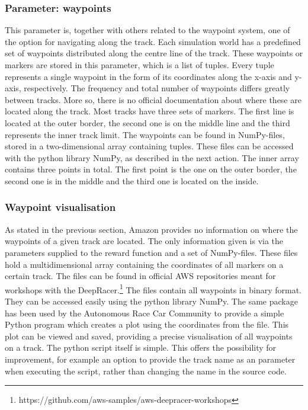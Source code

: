 \subsubsection{Parameter: waypoints}\label{sec:param_waypoints}
This parameter is, together with others related to the waypoint system, one of the option for navigating along the track. Each simulation world has a predefined set of waypoints distributed along the centre line of the track. These waypoints or markers are stored in this parameter, which is a list of tuples. Every tuple represents a single waypoint in the form of its coordinates along the x-axis and y-axis, respectively. The frequency and total number of waypoints differs greatly between tracks. More so, there is no official documentation about where these are located along the track. Most tracks have three sets of markers. The first line is located at the outer border, the second one is on the middle line and the third represents the inner track limit. The waypoints can be found in NumPy-files, stored in a two-dimensional array containing tuples. These files can be accessed with the python library NumPy, as described in the next action. The inner array contains three points in total. The first point is the one on the outer border, the second one is in the middle and the third one is located on the inside.

\subsubsection{Waypoint visualisation}
As stated in the previous section, Amazon provides no information on where the waypoints of a given track are located. The only information given is via the parameters supplied to the reward function and a set of NumPy-files. These files hold a multidimensional array containing the coordinates of all markers on a certain track. The files can be found in official AWS repositories meant for workshops with the DeepRacer.\footnote{https://github.com/aws-samples/aws-deepracer-workshops} The files contain all waypoints in binary format. They can be accessed easily using the python library NumPy.
The same package has been used by the Autonomous Race Car Community to provide a simple Python program which creates a plot using the coordinates from the file. This plot can be viewed and saved, providing a precise visualisation of all waypoints on a track. The python script itself is simple. This offers the possibility for improvement, for example an option to provide the track name as an parameter when executing the script, rather than changing the name in the source code.

